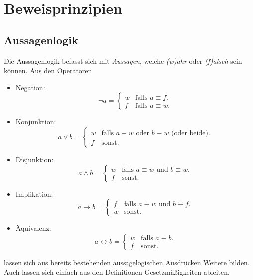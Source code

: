 \documentclass{scrreprt}[twoside=true]
\begin{document}
	\tableofcontents


	\chapter{Beweisprinzipien}

	\section{Aussagenlogik}

	

		Die Aussagenlogik befasst sich mit \emph{Aussagen}, welche \emph{(w)ahr} oder \emph{(f)alsch} sein können. Aus den Operatoren 
		\begin{itemize}
			\item
				Negation:
				\begin{equation*}
					\neg a =
						\begin{cases}
							w & \text{falls $a \equiv f$}.\\
							f & \text{falls $a \equiv w$}.
						\end{cases}
				\end{equation*}
			\item
				Konjunktion:
				\begin{equation*}
					a \lor b =
						\begin{cases}
							w & \text{falls $a \equiv w$ oder $b \equiv w$ (oder beide)}.\\
							f & \text{sonst}.
						\end{cases}
				\end{equation*}
			\item
				Disjunktion:
				\begin{equation*}
					a \land b =
						\begin{cases}
							w & \text{falls $a \equiv w$ und $b \equiv w$}.\\
							f & \text{sonst}.
						\end{cases}
				\end{equation*}
			\item
				Implikation:
				\begin{equation*}
					a \rightarrow b =
						\begin{cases}
							f & \text{falls $a \equiv w$ und $b \equiv f$}.\\
							w & \text{sonst}.
						\end{cases}
				\end{equation*}
			\item
				Äquivalenz:
				\begin{equation*}
					a \leftrightarrow b =
						\begin{cases}
							w & \text{falls $a \equiv b$}.\\
							f & \text{sonst}.
						\end{cases}
				\end{equation*}
		\end{itemize}
		lassen sich aus bereits bestehenden aussagelogischen Ausdrücken Weitere bilden. Auch lassen sich einfach aus den Definitionen Gesetzmäßigkeiten ableiten.
\end{document}
